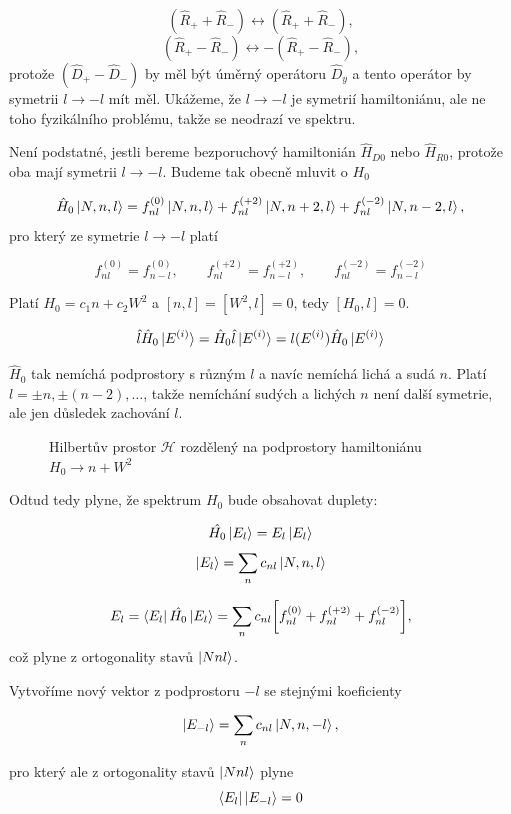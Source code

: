 \documentclass{article}
\begin{document}
$$(\hat{R}_{+} + \hat{R}_{-}) \leftrightarrow (\hat{R}_{+} + \hat{R}_{-}),  $$
$$(\hat{R}_{+} - \hat{R}_{-}) \leftrightarrow -(\hat{R}_{+} - \hat{R}_{-}),$$
protože $(\hat{D}_{+} - \hat{D}_{-})$ by měl být úměrný operátoru $\hat{D}_{y}$ a tento operátor 
by symetrii $l \rightarrow -l$ mít měl. Ukážeme, že $l \rightarrow -l$ je symetrií hamiltoniánu,
ale ne toho fyzikálního problému, takže se neodrazí ve spektru.

Není podstatné, jestli bereme bezporuchový hamiltonián $\hat{H}_{D0}$ nebo $\hat{H}_{R0}$, protože oba mají symetrii $l \rightarrow -l$.
Budeme tak obecně mluvit o $H_0$

$$\hat{H}_{0}\ket{N,n,l} = f_{nl}^{(0)}\ket{N,n,l} + f_{nl}^{(+2)}\ket{N,n+2,l} +f_{nl}^{(-2)}\ket{N,n-2,l},$$
pro který ze symetrie $l \rightarrow -l$ platí 

$$f_{nl}^{(0)} = f_{n-l}^{(0)}, \qquad f_{nl}^{(+2)} = f_{n-l}^{(+2)}, \qquad f_{nl}^{(-2)} = f_{n-l}^{(-2)}$$

Platí $H_{0} = c_1 n + c_2 W^2$ a $[n,l] =[W^2,l] = 0$, tedy $[H_0,l]=0$.

$$\hat{l}\hat{H}_0 \ket{E^{(i)}} = \hat{H}_0 \hat{l} \ket{E^{(i)}} =  l(E^{(i)}) \hat{H}_0 \ket{E^{(i)}} $$

$\hat{H}_{0}$ tak nemíchá podprostory s různým $l$ a navíc nemíchá lichá a sudá $n$. Platí $l = \pm n,\pm (n - 2), \dots$,
takže nemíchání sudých a lichých $n$ není další symetrie, ale jen důsledek zachování $l$.

\begin{figure}[H]
    \centering
    \def\svgwidth{10cm}
     
     \caption*{Hilbertův prostor $\mathcal{H}$ rozdělený na podprostory hamiltoniánu $H_{0} \rightarrow
     n + W^2$}    
\end{figure}

Odtud tedy plyne, že spektrum $H_0$ bude obsahovat duplety:

$$\hat{H_0}\ket{E_l} = E_l \ket{E_l}$$
$$\ket{E_l} = \sum_n c_{nl}\ket{N,n,l}$$

$$E_l = \bra{E_l}\hat{H_0}\ket{E_l} = 
\sum_n c_{nl}\bigg[  f_{nl}^{(0)} + f_{nl}^{(+2)} +f_{nl}^{(-2)} \bigg],$$
což plyne z ortogonality stavů $\ket{Nnl}$.

Vytvoříme nový vektor z podprostoru $-l$ se stejnými koeficienty

$$ \ket{E_{-l}} = \sum_n c_{nl}\ket{N,n,-l},$$

pro který ale z ortogonality stavů $\ket{Nnl}$ plyne 
$$\bra{E_l}\ket{E_{-l}} = 0$$
\end{document}
